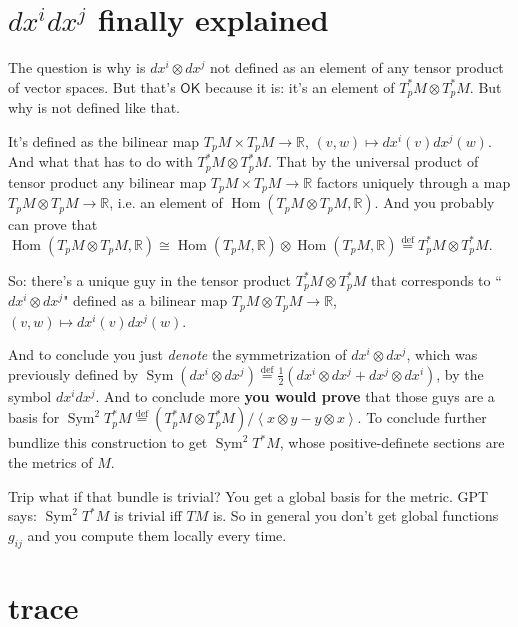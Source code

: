 \section{\(dx^idx^j\) finally explained}

The question is why is \(dx^i  \otimes dx^j\) not defined as an element of any tensor product of vector spaces. But that's  $\mathsf{OK}$ because it is: it's an element of \(T_p^*M\otimes T^*_pM\). But why is not defined like that.

It's defined as the bilinear map \(T_pM \times T_pM\to \mathbb{R}\), \((v,w)\mapsto dx^i(v)dx^j(w)\). And what that has to do with \(T_p ^*M\otimes T_p ^*M\). That by the universal product of tensor product any bilinear map \(T_pM \times T_pM\to \mathbb{R}\) factors uniquely through a map \(T_pM \otimes T_pM \to \mathbb{R}\), i.e. an element of \(\operatorname{Hom}(T_pM \otimes T_pM, \mathbb{R})\). And you probably can prove that \(\operatorname{Hom}(T_pM \otimes T_p M, \mathbb{R})\cong \operatorname{Hom}(T_pM,\mathbb{R})\otimes \operatorname{Hom}(T_pM, \mathbb{R})\overset{\operatorname{def}}{=}T_p ^*M \otimes T^*_pM\).

So: there's a unique guy in the tensor product \(T_p ^*M \otimes T^*_pM\) that corresponds to ``\(dx^i \otimes dx^j\)" defined as a bilinear map \(T_pM \otimes T_pM\to \mathbb{R}\), \((v,w)\mapsto dx^i(v)dx^j(w)\).

And to conclude you just \textit{denote} the symmetrization of \(dx^i \otimes dx^j\), which was previously defined by \(\operatorname{Sym}(dx^i \otimes dx^j)\overset{\operatorname{def}}{=}\frac{1}{2}(dx^i \otimes dx^j +dx^j \otimes dx^i)\), by the symbol \(dx^idx^j\). And to conclude more \textbf{you would prove} that those guys are a basis for \(\operatorname{Sym}^2T_p^*M\overset{\operatorname{def}}{=}(T_p^* M \otimes T_p^*M)/\left<x \otimes y-y \otimes x\right>\). To conclude further bundlize this construction to get \(\operatorname{Sym}^2T^*M\), whose positive-definete sections are the metrics of \(M\).

\begin{thing8}{Trip}\leavevmode
what if that bundle is trivial? You get a global basis for the metric. GPT says: \(\operatorname{Sym}^2T^*M\) is trivial iff \(TM\) is. So in general you don't get global functions \(g_{ij}\) and you compute them locally every time.
\end{thing8}

\section{trace}

